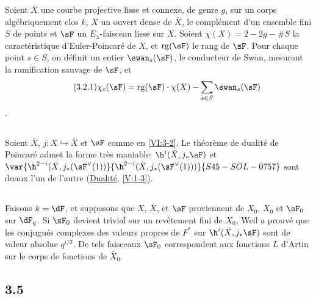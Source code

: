 Soient $\bar X$ une courbe projective lisse et connexe, de genre $g$, sur un 
corps algébriquement clos $k$, $X$ un ouvert dense de $\bar X$, 
le complément d'un ensemble fini $S$ de points et $\sF$ un 
$E_\lambda$-faisceau lisse sur $X$. Soient $\chi(X)=2-2 g-\# S$ la 
caractéristique d'Euler-Poincaré de $X$, et $\operatorname{rg}(\sF)$ le 
rang de $\sF$. Pour chaque point $s\in S$, on définit un entier 
$\swan_s(\sF)$, le conducteur de Swan, mesurant la ramification sauvage de 
$\sF$, et 
\begin{align*}\tag{3.2.1}\label{VI:eq:3-2-1}
  \chi_c(\sF) = \operatorname{rg}(\sF) \cdot \chi(X) - \sum_{s\in S} \swan_s(\sF) 
\end{align*}
. 





\subsection{}\label{VI:3-3}

Soient $\bar X$, $j:X\hookrightarrow\bar X$ et $\sF$ comme en \ref{VI:3-2}. Le 
théorème de dualité de Poincaré admet la forme très maniable: 
$\h^i(\bar X,j_\ast \sF)$ et $\var{\h^{2-i}(\bar X,j_\ast(\sF^\vee(1))}{\h^{2-i}(\bar X,j_\ast(\sF^\vee(1)))}{S45-SOL-0757}$ sont 
duaux l'un de l'autre (\hyperref[V]{Dualité}, \ref{V:1-3}). 





\subsection{}\label{VI:3-4}

Faisons $k=\dF$, et supposons que $X$, $\bar X$, et $\sF$ proviennent de 
$X_0$, $\bar X_0$ et $\sF_0$ sur $\dF_q$. Si $\sF_0$ devient trivial sur un 
revêtement fini de $X_0$, Weil a prouvé que les conjugués complexes des 
valeurs propres de $F^\ast$ sur $\h^i(\bar X,j_\ast\sF)$ sont de valeur 
absolue $q^{i/2}$. De tels faisceaux $\sF_0$ correspondent aux fonctions $L$ 
d'Artin sur le corps de fonctions de $\bar X_0$. 





\subsection*{3.5}\label{VI:3-5_} %

